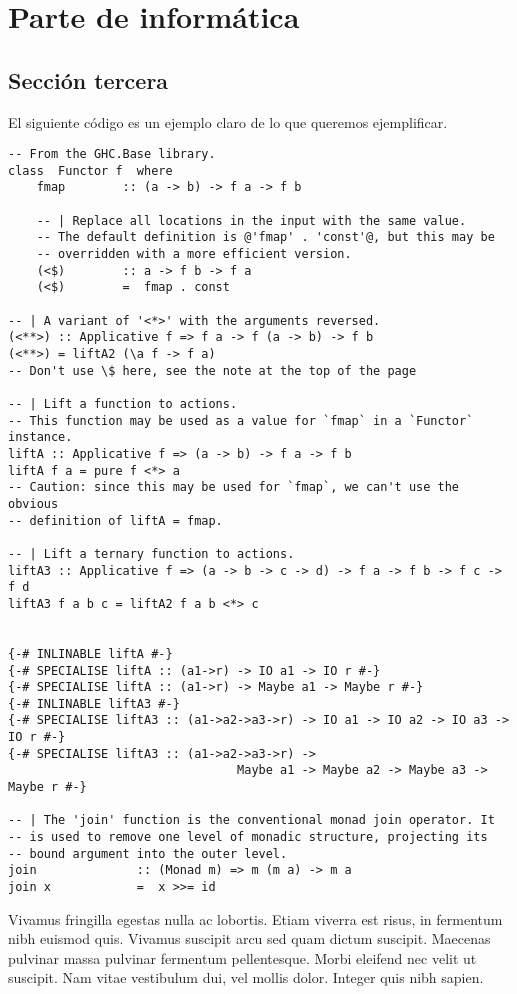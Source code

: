 \documentclass[oneside,openright,titlepage,numbers=noenddot,openany,headinclude,footinclude=true,
cleardoublepage=empty,abstractoff,BCOR=5mm,paper=a4,fontsize=12pt,ngerman,spanish]{scrreprt}
\begin{document}

\part{Parte de informática}
\chapter{Sección tercera}
El siguiente código es un ejemplo claro de lo que queremos
ejemplificar.

\begin{verbatim}
-- From the GHC.Base library.
class  Functor f  where
    fmap        :: (a -> b) -> f a -> f b

    -- | Replace all locations in the input with the same value.
    -- The default definition is @'fmap' . 'const'@, but this may be
    -- overridden with a more efficient version.
    (<$)        :: a -> f b -> f a
    (<$)        =  fmap . const

-- | A variant of '<*>' with the arguments reversed.
(<**>) :: Applicative f => f a -> f (a -> b) -> f b
(<**>) = liftA2 (\a f -> f a)
-- Don't use \$ here, see the note at the top of the page

-- | Lift a function to actions.
-- This function may be used as a value for `fmap` in a `Functor` instance.
liftA :: Applicative f => (a -> b) -> f a -> f b
liftA f a = pure f <*> a
-- Caution: since this may be used for `fmap`, we can't use the obvious
-- definition of liftA = fmap.

-- | Lift a ternary function to actions.
liftA3 :: Applicative f => (a -> b -> c -> d) -> f a -> f b -> f c -> f d
liftA3 f a b c = liftA2 f a b <*> c


{-# INLINABLE liftA #-}
{-# SPECIALISE liftA :: (a1->r) -> IO a1 -> IO r #-}
{-# SPECIALISE liftA :: (a1->r) -> Maybe a1 -> Maybe r #-}
{-# INLINABLE liftA3 #-}
{-# SPECIALISE liftA3 :: (a1->a2->a3->r) -> IO a1 -> IO a2 -> IO a3 -> IO r #-}
{-# SPECIALISE liftA3 :: (a1->a2->a3->r) ->
                                Maybe a1 -> Maybe a2 -> Maybe a3 -> Maybe r #-}

-- | The 'join' function is the conventional monad join operator. It
-- is used to remove one level of monadic structure, projecting its
-- bound argument into the outer level.
join              :: (Monad m) => m (m a) -> m a
join x            =  x >>= id
\end{verbatim}

Vivamus fringilla egestas nulla ac lobortis. Etiam viverra est risus,
in fermentum nibh euismod quis. Vivamus suscipit arcu sed quam dictum
suscipit. Maecenas pulvinar massa pulvinar fermentum
pellentesque. Morbi eleifend nec velit ut suscipit. Nam vitae
vestibulum dui, vel mollis dolor. Integer quis nibh sapien.




\end{document}
